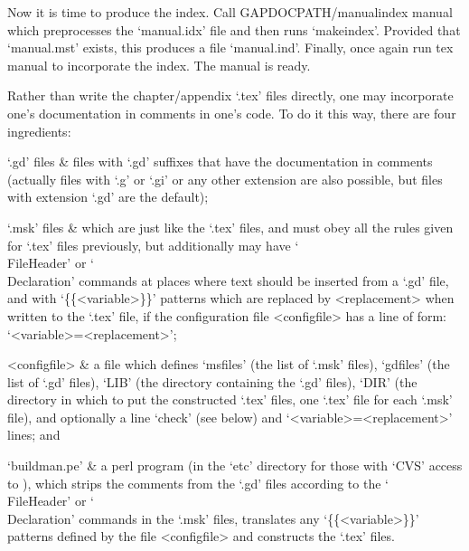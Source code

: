 Now it is time to produce the index. Call
\begintt
GAPDOCPATH/manualindex manual
\endtt
which preprocesses the `manual.idx' file and then
runs `makeindex'. Provided that `manual.mst' exists, this produces a file
`manual.ind'. Finally, once again run
\begintt
tex manual
\endtt
to incorporate the index. The manual is ready.


\indextt{\\Declaration}\indextt{\\FileHeader}
Rather than write the chapter/appendix `.tex'  files  directly,  one  may
incorporate one's documentation in comments in one's {\GAP} code.  To  do
it this way, there are four ingredients:

\beginitems

`.gd' files &
{\GAP} files with `.gd' suffixes that have the documentation in  comments
(actually files with `.g' or  `.gi'  or  any  other  extension  are  also
possible, but files with extension `.gd' are the default);

`.msk' files &
which are just like the `.tex' files, and must obey all the  rules  given
for `.tex' files previously, but additionally may have `\\FileHeader'  or
`\\Declaration' commands at places where text should be inserted  from  a
`.gd' file, and with `\{\{<variable>\}\}' patterns which are replaced  by
<replacement> when written to the `.tex' file, if the configuration  file
<configfile> has a line of form: `<variable>=<replacement>';

<configfile> &
a file which defines `msfiles' (the list of `.msk' files), `gdfiles' (the
list of `.gd' files), `LIB' (the directory containing the  `.gd'  files),
`DIR' (the directory in which to put the constructed  `.tex'  files,  one
`.tex' file for each `.msk' file), and optionally  a  line  `check'  (see
below) and `<variable>=<replacement>' lines; and

`buildman.pe' &
a perl program (in the `etc' directory for those  with  `CVS'  access  to
{\GAP}), which strips the comments from the `.gd' files according to  the
`\\FileHeader'  or  `\\Declaration'  commands  in   the   `.msk'   files,
translates  any  `\{\{<variable>\}\}'  patterns  defined  by   the   file
<configfile> and constructs the `.tex' files.

